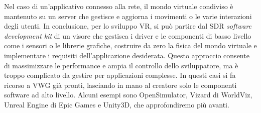 Nel caso di un'applicativo connesso alla rete, il mondo virtuale condiviso è mantenuto su un server che gestisce e aggiorna i movimenti o le varie interazioni degli utenti.
In conclusione, per lo sviluppo VR, si può partire dal SDR \textit{software development kit} di un visore che gestisca i driver e le componenti di basso livello come i sensori o le librerie grafiche, costruire da zero la fisica del mondo virtuale e implementare i requisiti dell'applicazione desiderata. Questo approccio consente di massimizzare le performance e ampia il controllo dello sviluppatore, ma è troppo complicato da gestire per applicazioni complesse. In questi casi si fa ricorso a VWG già pronti, lasciando in mano al creatore solo le componenti software ad alto livello. Alcuni esempi sono OpenSimulator, Vizard di WorldViz, Unreal Engine di Epic Games e Unity3D, che approfondiremo più avanti.

